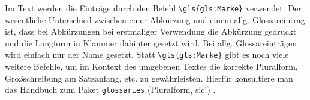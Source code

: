 Im Text werden die Einträge durch den Befehl \verb#\gls{gls:Marke}# verwendet.
Der wesentliche Unterschied zwischen einer Abkürzung und einem allg.
Glossareintrag ist, dass bei Abkürzungen bei erstmaliger Verwendung die
Abkürzung gedruckt und die Langform in Klammer dahinter gesetzt wird.
Bei allg. Glossareinträgen wird einfach nur der Name gesetzt. Statt
\verb#\gls{gls:Marke}# gibt es noch viele weitere Befehle, um im Kontext des
umgebenen Textes die korrekte Pluralform, Großschreibung am Satzanfang, etc.
zu gewährleisten. Hierfür konsultiere man das Handbuch zum Paket \texttt{glossaries}
(Pluralform, sic!) \parencite{talbot2014}.
